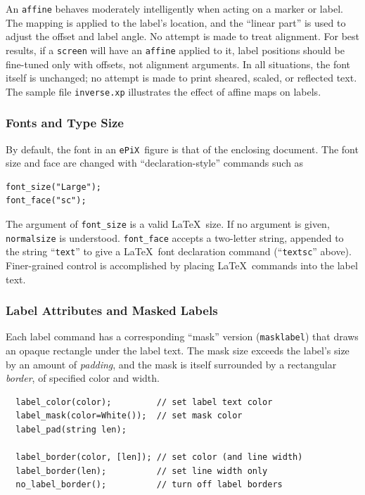 \documentclass[12pt,letterpaper]{book}
\newcommand{\code}[1]{\texttt{#1}}
\newcommand{\filename}[1]{\texttt{#1}}
\newcommand{\ePiX}{\code{ePiX}}
\newcommand{\findex}[1]{\ignorespaces}
\begin{document}
An \code{affine} behaves moderately intelligently when acting on a
marker or label. The mapping is applied to the label's location, and
the ``linear part'' is used to adjust the offset and label angle. No
attempt is made to treat alignment. For best results, if a
\code{screen} will have an \code{affine} applied to it, label
positions should be fine-tuned only with offsets, not alignment
arguments.  In all situations, the font itself is unchanged; no
attempt is made to print sheared, scaled, or reflected text. The
sample file \filename{inverse.xp} illustrates the effect of affine
maps on labels.


\subsubsection*{Fonts and Type Size}

By default, the font in an \ePiX\ figure is that of the enclosing
document. The font size and face are changed with
``declaration-style'' commands such as
\findex{font\_size}
\findex{font\_face}
\begin{verbatim}
font_size("Large");
font_face("sc");
\end{verbatim}
The argument of \verb+font_size+ is a valid \LaTeX\ size. If no
argument is given, \code{normalsize} is understood. \verb+font_face+
accepts a two-letter string, appended to the string ``\code{text}'' to
give a \LaTeX\ font declaration command (``\code{textsc}'' above).
Finer-grained control is accomplished by placing \LaTeX\ commands
into the label text.


\subsubsection*{Label Attributes and Masked Labels}

%
Each label command has a corresponding ``mask'' version
(\code{masklabel}) that draws an opaque rectangle under the label
text. The mask size exceeds the label's size by an amount of
\emph{padding}, and the mask is itself surrounded by a rectangular
\emph{border}, of specified color and width.
\findex{label\_color}
\findex{label\_mask}
\findex{label\_pad}
\findex{label\_border}
\findex{no\_label\_border}
\begin{verbatim}
  label_color(color);         // set label text color
  label_mask(color=White());  // set mask color
  label_pad(string len);

  label_border(color, [len]); // set color (and line width)
  label_border(len);          // set line width only
  no_label_border();          // turn off label borders
\end{verbatim}
\end{document}
